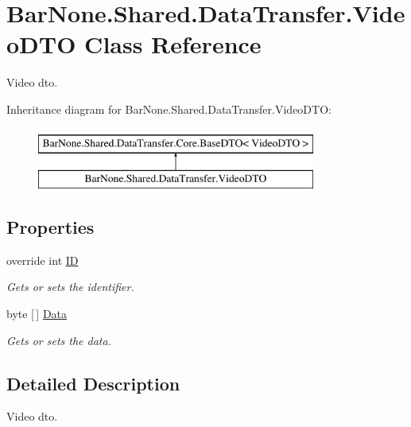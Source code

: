 \hypertarget{class_bar_none_1_1_shared_1_1_data_transfer_1_1_video_d_t_o}{}\section{Bar\+None.\+Shared.\+Data\+Transfer.\+Video\+D\+TO Class Reference}
\label{class_bar_none_1_1_shared_1_1_data_transfer_1_1_video_d_t_o}


Video dto.  


Inheritance diagram for Bar\+None.\+Shared.\+Data\+Transfer.\+Video\+D\+TO\+:\begin{figure}[H]
\begin{center}
\leavevmode
\includegraphics[height=2.000000cm]{class_bar_none_1_1_shared_1_1_data_transfer_1_1_video_d_t_o}
\end{center}
\end{figure}
\subsection*{Properties}
\begin{DoxyCompactItemize}
\item 
override int \mbox{\hyperlink{class_bar_none_1_1_shared_1_1_data_transfer_1_1_video_d_t_o_a7e00584b13dd5cc9e4043f9464eb8b69}{ID}}
\begin{DoxyCompactList}\small\item\em Gets or sets the identifier. \end{DoxyCompactList}\item 
byte \mbox{[}$\,$\mbox{]} \mbox{\hyperlink{class_bar_none_1_1_shared_1_1_data_transfer_1_1_video_d_t_o_ae0aeee832b3ed173e06eec7d711e26ad}{Data}}
\begin{DoxyCompactList}\small\item\em Gets or sets the data. \end{DoxyCompactList}\end{DoxyCompactItemize}


\subsection{Detailed Description}
Video dto. 

